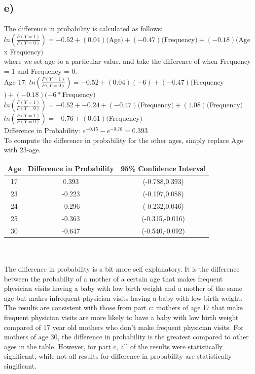 \documentclass[12pt, letterpaper]{article}
\begin{document}
\subsection*{e)} The difference in probability is calculated as follows: \\
$ln(\frac{P(Y=1)}{P(Y=0)}) = -0.52 + (0.04)($Age$) + (-0.47)($Frequency$) + (-0.18)($Age x Frequency$)$\\
where we set age to a particular value, and take the difference of when Frequency = 1 and Frequency = 0.\\
Age 17: $ln(\frac{P(Y=1)}{P(Y=0)}) = -0.52 + (0.04)(-6) + (-0.47)($Frequency$) + (-0.18)(-6 * $Frequency$)$\\
$ln(\frac{P(Y=1)}{P(Y=0)}) = -0.52 + -0.24 + (-0.47)($Frequency$) + (1.08)($Frequency$)$\\
$ln(\frac{P(Y=1)}{P(Y=0)}) = -0.76 + (0.61)($Frequency$)$\\
Difference in Probability: $e^{-0.15} - e^{-0.76} = 0.393$\\
To compute the difference in probability for the other ages, simply replace Age with 23-age.\\
 \begin{tabular}{ |c|c|c| } 
 \hline
 \textbf{Age} & \textbf{Difference in Probability} & \textbf{95\% Confidence Interval} \\ 
\hline
 17 & 0.393 & (-0.788,0.393) \\ 
\hline
 23 & -0.223 & (-0.197,0.088) \\ 
 \hline
 24 & -0.296 & (-0.232,0.046) \\ 
 \hline
 25 & -0.363 & (-0.315,-0.016) \\ 
 \hline
 30 & -0.647 & (-0.540,-0.092) \\ 
 \hline
\end{tabular}\\\\
The difference in probability is a bit more self explanatory. It is the difference between the probabilty of a mother of a certain age that makes frequent physician visits having a baby with low birth weight and a mother of the same age but makes infrequent physician visits having a baby with low birth weight. The results are consistent with those from part c: mothers of age 17 that make frequent physician visits are more likely to have a baby with low birth weight compared of 17 year old mothers who don't make frequent physician visits. For mothers of age 30, the difference in probability is the greatest compared to other ages in the table. However, for part c, all of the results were statistically significant, while not all results for difference in probability are statistically singificant.
\end{document}
